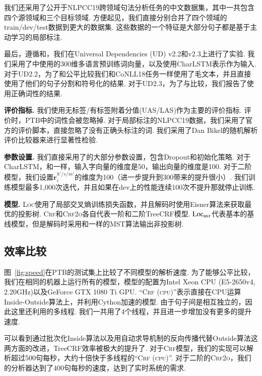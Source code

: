 我们还采用了公开于NLPCC19跨领域句法分析任务的中文数据集\cite{peng2019overview}，其中一共包含四个源领域和三个目标领域.
方便起见，我们直接分别合并了四个领域的train/dev/test数据到更大的数据集.
这些数据的一个特征是大部分句子都是基于主动学习的局部标注.

最后，遵循\cite{ji-etal-2019-graph}和\cite{zhang-etal-2019-empirical}，我们在Universal Dependencies (UD) v2.2和v2.3上进行了实验.
我们采用了\cite{zeman-etal-2018-conll}中使用的300维多语言预训练词向量，以及使用CharLSTM表示作为输入.
对于UD2.2，为了和\cite{ji-etal-2019-graph}公平比较我们和CoNLL18任务一样\cite{zeman-etal-2018-conll}使用了毛文本，并且直接使用了他们的句子分割和符号化的结果.
对于UD2.3，为了与\cite{zhang-etal-2019-empirical}比较，我们报告了使用正确词性的结果.



\noindent\textbf{评价指标.}
我们使用无标签/有标签附着分值(UAS/LAS)作为主要的评价指标.
评价时，PTB中的词性会被忽略掉.
对于局部标注的NLPCC19数据，我们采用了官方的评价脚本，直接忽略了没有正确头标注的词.
我们采用了Dan Bikel的随机解析评价比较器来进行显著性检验.

\noindent\textbf{参数设置.}
我们直接采用了\cite{Timothy-d17-biaffine}的大部分参数设置，包含Dropout和初始化策略.
对于CharLSTM，和\cite{lample-etal-2016-neural}一样，输入字向量的维度是50，输出向量的维度是100.
对于二阶模型，我们设置$\mathbf{r}^{h'/s/m'}_i$的维度为100（进一步提升到300带来的提升很小）.
我们训练模型最多1,000次迭代，并且如果在dev上的性能连续100次不提升那就停止训练.

\noindent\textbf{模型.}
\textsc{Loc}使用了局部交叉熵训练损失函数，并且解码时使用Eisner算法来获取最优的投影树.
\textsc{Crf}和\textsc{Crf2o}各自代表一阶和二阶TreeCRF模型.
$\textsc{Loc}_{\textsc{mst}}$代表基本的基线模型，但是解码时采用和\cite{Timothy-d17-biaffine}一样的MST算法输出非投影树.

\subsection{效率比较}

图~\ref{fig:speed}在PTB的测试集上比较了不同模型的解析速度.
为了能够公平比较，我们在相同的机器上运行所有的模型，模型的配置为Intel Xeon CPU (E5-2650v4, 2.20GHz)以及GeForce GTX 1080 Ti GPU.
``\textsc{Crf (cpu)}''表示直接在CPU运算Inside-Outside算法上，并利用Cython加速的模型.
由于句子间是相互独立的，因此这里还利用的多线程.
我们一共用了4个线程，并且进一步增加没有更多的提升速度.

可以看到通过批次化Inside算法以及用自动求导机制的反向传播代替Outside算法这两方面的改进，TreeCRF效率被极大的提升了.
对于\textsc{Crf}模型，我们的实现可以解析超过500句每秒，大约十倍快于多线程的``\textsc{Crf (cpu)}''.
对于二阶的\textsc{Crf2o}，我们的分析器达到了400句每秒的速度，达到了实时系统的需求.

